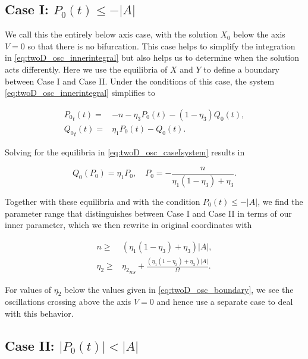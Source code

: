 \subsection{Case I: $P_0(t)\le -|A|$}
\label{subsec:twoD_highfreqosc_caseI}

We call this the entirely below axis case, with the solution $X_0$ below the axis $V=0$ so that there is no bifurcation. This case helps to simplify the integration in \eqref{eq:twoD_osc_innerintegral} but also helps us to determine when the solution acts differently. Here we use the equilibria of $X$ and $Y$ to define a boundary between Case I and Case II. Under the conditions of this case, the system \eqref{eq:twoD_osc_innerintegral} simplifies to

\begin{equation}\label{eq:twoD_osc_caseIsystem}
\begin{aligned}
{P_0}_t(t) =& -n -\eta_3P_0(t)-(1-\eta_3)Q_0(t),\\
{Q_0}_t(t) =& \eta_1P_0(t)-Q_0(t).
\end{aligned}
\end{equation}

Solving for the equilibria in \eqref{eq:twoD_osc_caseIsystem} results in

\begin{equation*}
Q_0(P_0)=\eta_1P_0,\quad P_0=-\frac{n}{\eta_1(1-\eta_3)+\eta_3}. 
\end{equation*}

Together with these equilibria and with the condition $P_0(t)\le -|A|$, we find the parameter range that distinguishes between Case I and Case II in terms of our inner parameter, which we then rewrite in original coordinates with

\begin{equation}\label{eq:twoD_osc_boundary}
\begin{aligned}
n\ge& (\eta_1(1-\eta_3)+\eta_3)|A|,\\
\eta_2\ge&{\eta_2}_{ns}+ \frac{(\eta_1(1-\eta_3)+\eta_3)|A|}{\Omega}.
\end{aligned}
\end{equation}

For values of $\eta_2$ below the values given in \eqref{eq:twoD_osc_boundary}, we see the oscillations crossing above the axis $V=0$ and hence use a separate case to deal with this behavior.

\subsection{Case II: $|P_0(t)|<|A|$}
\label{subsec:twoD_highfreqosc_caseII}

